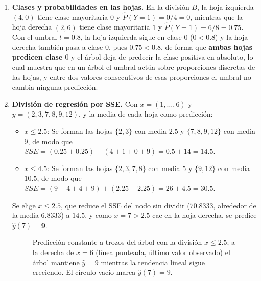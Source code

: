 \begin{enumerate}
\item \textbf{Clases y probabilidades en las hojas.}
En la división $B$, la hoja izquierda $(4,0)$ tiene clase mayoritaria
$0$ y $\hat P(Y=1)=0/4=0$, mientras que la hoja derecha $(2,6)$ tiene
clase mayoritaria $1$ y $\hat P(Y=1)=6/8=0.75$. Con el umbral
$t=0.8$, la hoja izquierda sigue en clase $0$ ($0<0.8$) y la hoja
derecha también pasa a clase $0$, pues $0.75<0.8$, de forma que
\textbf{ambas hojas predicen clase $0$} y el árbol deja de predecir la
clase positiva en absoluto, lo cual muestra que en un árbol el umbral
actúa sobre proporciones discretas de las hojas, y entre dos valores
consecutivos de esas proporciones el umbral no cambia ninguna
predicción.

\item \textbf{División de regresión por SSE.}
Con $x=(1,\dots,6)$ y $y=(2,3,7,8,9,12)$, y la media de cada hoja como
predicción:
\begin{itemize}
    \item $x\le2.5$: Se forman las hojas $\{2,3\}$ con media $2.5$ y
    $\{7,8,9,12\}$ con media $9$, de modo que
    $SSE=(0.25+0.25)+(4+1+0+9)=0.5+14=\mathbf{14.5}$.
    \item $x\le4.5$: Se forman las hojas $\{2,3,7,8\}$ con media $5$ y
    $\{9,12\}$ con media $10.5$, de modo que
    $SSE=(9+4+4+9)+(2.25+2.25)=26+4.5=30.5$.
\end{itemize}
Se elige $x\le2.5$, que reduce el SSE del nodo sin dividir ($70.8333$,
alrededor de la media $6.8333$) a $14.5$, y como $x=7>2.5$ cae en la
hoja derecha, se predice $\hat y(7)=\mathbf{9}$.

\begin{figure}[H]
\centering
{}
\caption{Predicción constante a trozos del árbol con la división
$x\le2.5$; a la derecha de $x=6$ (línea punteada, último valor
observado) el árbol mantiene $\hat y=9$ mientras la tendencia lineal
sigue creciendo. El círculo vacío marca $\hat y(7)=9$.}
\end{figure}


\end{enumerate}
